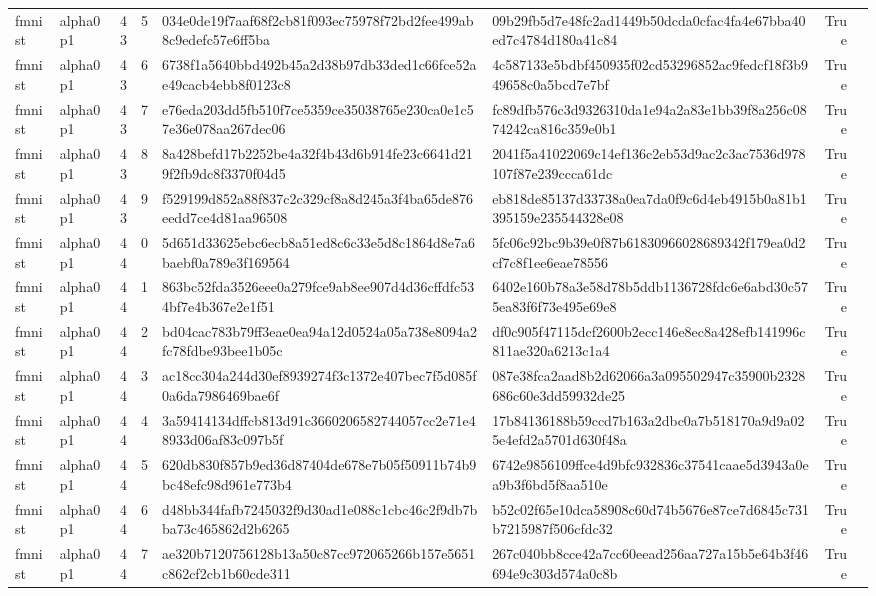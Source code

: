 \begin{tabular}{llrrllrl}
fmnist & alpha0p1 & 43 & 5 & 034e0de19f7aaf68f2cb81f093ec75978f72bd2fee499ab8c9edefc57e6ff5ba & 09b29fb5d7e48fc2ad1449b50dcda0cfac4fa4e67bba40ed7c4784d180a41c84 & True &  \\
fmnist & alpha0p1 & 43 & 6 & 6738f1a5640bbd492b45a2d38b97db33ded1c66fce52ae49cacb4ebb8f0123c8 & 4c587133e5bdbf450935f02cd53296852ac9fedcf18f3b949658c0a5bcd7e7bf & True &  \\
fmnist & alpha0p1 & 43 & 7 & e76eda203dd5fb510f7ce5359ce35038765e230ca0e1c57e36e078aa267dec06 & fc89dfb576c3d9326310da1e94a2a83e1bb39f8a256c0874242ca816c359e0b1 & True &  \\
fmnist & alpha0p1 & 43 & 8 & 8a428befd17b2252be4a32f4b43d6b914fe23c6641d219f2fb9dc8f3370f04d5 & 2041f5a41022069c14ef136c2eb53d9ac2c3ac7536d978107f87e239ccca61dc & True &  \\
fmnist & alpha0p1 & 43 & 9 & f529199d852a88f837c2c329cf8a8d245a3f4ba65de876eedd7ce4d81aa96508 & eb818de85137d33738a0ea7da0f9c6d4eb4915b0a81b1395159e235544328e08 & True &  \\
fmnist & alpha0p1 & 44 & 0 & 5d651d33625ebc6ecb8a51ed8c6c33e5d8c1864d8e7a6baebf0a789e3f169564 & 5fc06c92bc9b39e0f87b61830966028689342f179ea0d2cf7c8f1ee6eae78556 & True &  \\
fmnist & alpha0p1 & 44 & 1 & 863bc52fda3526eee0a279fce9ab8ee907d4d36cffdfc534bf7e4b367e2e1f51 & 6402e160b78a3e58d78b5ddb1136728fdc6e6abd30c575ea83f6f73e495e69e8 & True &  \\
fmnist & alpha0p1 & 44 & 2 & bd04cac783b79ff3eae0ea94a12d0524a05a738e8094a2fc78fdbe93bee1b05c & df0c905f47115dcf2600b2ecc146e8ec8a428efb141996c811ae320a6213c1a4 & True &  \\
fmnist & alpha0p1 & 44 & 3 & ac18cc304a244d30ef8939274f3c1372e407bec7f5d085f0a6da7986469bae6f & 087e38fca2aad8b2d62066a3a095502947c35900b2328686c60e3dd59932de25 & True &  \\
fmnist & alpha0p1 & 44 & 4 & 3a59414134dffcb813d91c3660206582744057cc2e71e48933d06af83c097b5f & 17b84136188b59ccd7b163a2dbc0a7b518170a9d9a025e4efd2a5701d630f48a & True &  \\
fmnist & alpha0p1 & 44 & 5 & 620db830f857b9ed36d87404de678e7b05f50911b74b9bc48efc98d961e773b4 & 6742e9856109ffce4d9bfc932836c37541caae5d3943a0ea9b3f6bd5f8aa510e & True &  \\
fmnist & alpha0p1 & 44 & 6 & d48bb344fafb7245032f9d30ad1e088c1cbc46c2f9db7bba73c465862d2b6265 & b52c02f65e10dca58908c60d74b5676e87ce7d6845c731b7215987f506cfdc32 & True &  \\
fmnist & alpha0p1 & 44 & 7 & ae320b7120756128b13a50c87cc972065266b157e5651c862cf2cb1b60cde311 & 267c040bb8cce42a7cc60eead256aa727a15b5e64b3f46694e9c303d574a0c8b & True &  \\

\end{tabular}

